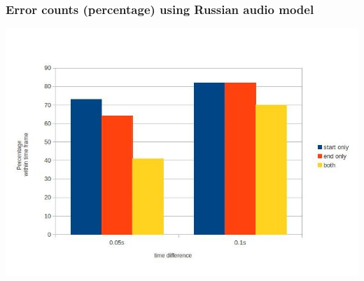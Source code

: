 \documentclass[]{beamer}
\begin{document}
\begin{frame}
    \frametitle{Error counts (percentage) using Russian audio model}
    \includegraphics[scale=0.37]{corpora_phoneme_russian_results.jpg}
\end{frame}
\end{document}
